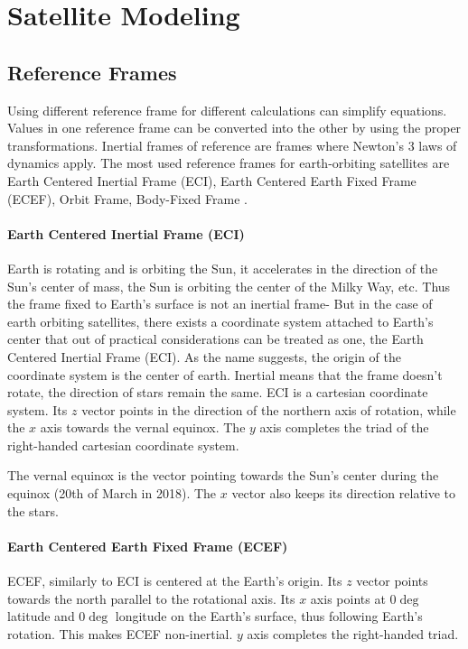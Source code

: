 \chapter{Satellite Modeling}

\section{Reference Frames}

Using different reference frame for different calculations can simplify equations. Values in one reference frame can be converted into the other by using the proper transformations.
Inertial frames of reference are frames where Newton's 3 laws of dynamics apply.
The most used reference frames for earth-orbiting satellites are Earth Centered Inertial Frame (ECI), Earth Centered Earth Fixed Frame (ECEF), Orbit Frame, Body-Fixed Frame  \cite{ref1} \cite{ref2}.

\subsubsection{Earth Centered Inertial Frame (ECI)}
Earth is rotating and is orbiting the Sun, it accelerates in the direction of the Sun's center of mass, the Sun is orbiting the center of the Milky Way, etc. Thus the frame fixed to Earth's surface is not an inertial frame- But in the case of earth orbiting satellites, there exists a coordinate system attached to Earth's center that out of practical considerations can be treated as one, the Earth Centered Inertial Frame (ECI).
As the name suggests, the origin of the coordinate system is the center of earth. Inertial means that the frame doesn't rotate, the direction of stars remain the same. 
ECI is a cartesian coordinate system. Its $z$ vector points in the direction of the northern axis of rotation, while the $x$ axis towards the vernal equinox. The $y$ axis completes the triad of the right-handed cartesian coordinate system.

The vernal equinox is the vector pointing towards the Sun's center during the equinox (20th of March in 2018). The $x$ vector also keeps its direction relative to the stars.


\subsubsection{Earth Centered Earth Fixed Frame (ECEF)}

ECEF, similarly to ECI is centered at the Earth's origin. Its $z$ vector points towards the north parallel to the rotational axis. Its $x$ axis points at $0\deg$ latitude and $0\deg$ longitude on the Earth's surface, thus following Earth's rotation. This makes ECEF non-inertial. $y$ axis completes the right-handed triad.

